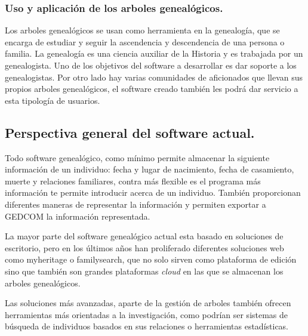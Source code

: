 \documentclass[12pt]{article} %
\begin{document}
\subsubsection{Uso y aplicación de los arboles genealógicos.}
Los arboles genealógicos se usan como herramienta en la genealogía, que se encarga de estudiar y seguir la ascendencia y descendencia de una persona o familia. La genealogía es una ciencia auxiliar de la Historia y es trabajada por un genealogista. Uno de los objetivos del software a desarrollar es dar soporte a los genealogistas. \linebreak Por otro lado hay varias comunidades de aficionados que llevan sus propios arboles genealógicos, el software creado también les podrá dar servicio a esta tipología de usuarios.

\newpage
\subsection{Perspectiva general del software actual.}
Todo software genealógico, como mínimo permite almacenar la siguiente información de un individuo: fecha y lugar de nacimiento, fecha de casamiento, muerte y relaciones familiares, contra más flexible es el programa más información te permite introducir acerca de un individuo. También proporcionan diferentes maneras de representar la información y permiten exportar a GEDCOM la información representada.

\noindent{}

La mayor parte del software genealógico actual esta basado en soluciones de escritorio, pero en los últimos años han proliferado diferentes soluciones web como myheritage o familysearch, que no solo sirven como plataforma de edición sino que también son grandes plataformas \textit{cloud} en las que se almacenan los arboles genealógicos.

Las soluciones más avanzadas, aparte de la gestión de arboles también ofrecen herramientas más orientadas a la investigación, como podrían ser sistemas de búsqueda de individuos basados en sus relaciones o herramientas estadísticas.
\end{document}
